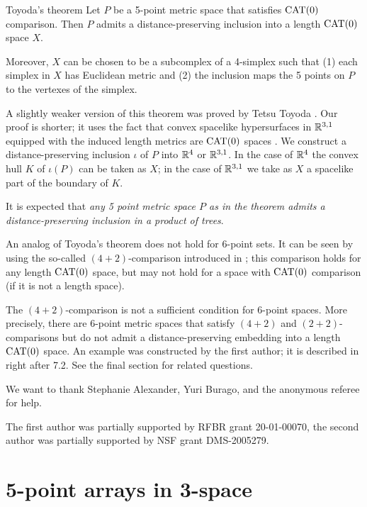\documentclass{article}
\begin{document}
\begin{thm}{Toyoda's theorem}
Let $P$ be a 5-point metric space that satisfies $\mathrm{CAT}(0)$ comparison.
Then $P$ admits a distance-preserving inclusion into a length $\mathrm{CAT}(0)$ space $X$.

Moreover,
$X$ can be chosen to be a subcomplex of a 4-simplex such that (1) each simplex in $X$ has Euclidean metric and (2) the inclusion maps the 5 points on $P$ to the vertexes of the simplex.
\end{thm}

A slightly weaker version of this theorem was proved by Tetsu Toyoda \cite{toyoda}.
Our proof is shorter; it uses the fact that convex spacelike hypersurfaces in $\mathbb{R}^{3,1}$ equipped with the induced length metrics are $\mathrm{CAT}(0)$ spaces \cite{milka}.
We construct a distance-preserving inclusion $\iota$ of $P$ into $\mathbb{R}^4$ or $\mathbb{R}^{3,1}$.
In the case of $\mathbb{R}^4$ the convex hull $K$ of $\iota(P)$ can be taken as $X$;
in the case of $\mathbb{R}^{3,1}$ we take as $X$ a spacelike part of the boundary of $K$.

It is expected that \emph{any 5 point metric space $P$ as in the theorem admits a distance-preserving inclusion in a product of trees}.

An analog of Toyoda's theorem does not hold for 6-point sets.
It can be seen by using the so-called $(4{+}2)$-comparison introduced in \cite{alexander-kapovitch-petrunin-2011};
this comparison holds for any length $\mathrm{CAT}(0)$ space, but may not hold for a space with $\mathrm{CAT}(0)$ comparison (if it is not a length space).

{\sloppy

The $(4{+}2)$-comparison is not a sufficient condition for $6$-point spaces.
More precisely, there are 6-point metric spaces that satisfy $(4{+}2)$ and $(2{+}2)$-comparisons but do not admit a distance-preserving embedding into a length $\mathrm{CAT}(0)$ space.
An example was constructed by the first author; it is described in \cite{alexander-kapovitch-petrunin-2011} right after 7.2.
See the final section for related questions.

}

We want to thank Stephanie Alexander,
Yuri Burago,
and the anonymous referee for help.

The first author was partially supported by RFBR grant   20-01-00070, 
the second author was partially supported by NSF grant DMS-2005279.

\section{5-point arrays in 3-space}
\end{document}
